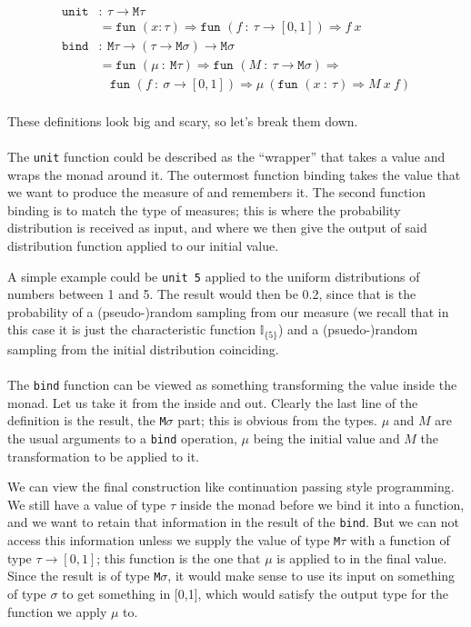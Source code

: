 \documentclass[11pt, leqno, titlepage]{article}
\theoremstyle{definition}
\begin{document}
\begin{align*}
  \texttt{unit} & :~ \tau\to\texttt{M}\tau\\
                & = \texttt{fun }(x:\tau)\Rightarrow
                  \texttt{fun }(f~:~\tau\to[0,1])\Rightarrow f~x\\
  \texttt{bind} & :~\texttt{M}\tau\to(\tau\to\texttt{M}\sigma)\to\texttt{M}\sigma\\
                & = \texttt{fun }(\mu~:~\texttt{M}\tau)\Rightarrow \texttt{fun }
                  (M~:~\tau\to\texttt{M}\sigma) \Rightarrow\\
                & ~~~~\texttt{fun }(f~:~\sigma\to[0,1])\Rightarrow \mu~ (\texttt{fun
                  }(x~:~\tau)\Rightarrow M~x~f)
\end{align*}
\\
These definitions look big and scary, so let's break them down.
\\ \\
The \texttt{unit} function could be described as the ``wrapper'' that takes a value
and wraps the monad around it. The outermost function binding
takes the value that we want to produce the measure of and remembers it. The second
function binding is to match the type of measures; this is where the probability
distribution is received as input, and where we then give the output of said
distribution function applied to our initial value.

A simple example could be \texttt{unit 5} applied to the uniform distributions of
numbers between 1 and 5. The result would then be 0.2, since that is the probability
of a (pseudo-)random sampling from our measure (we recall that in this case it is
just the characteristic function $\mathbb{I}_{\{5\}}$) and a (psuedo-)random sampling
from the initial distribution coinciding. 
\\ \\
The \texttt{bind} function can be viewed as something transforming the value inside
the monad. 
Let us take it from the inside and out. Clearly the last line of the definition is
the result, the \texttt{M}$\sigma$ part; this is obvious from the types. $\mu$ and
$M$ are the usual arguments to a \texttt{bind} operation, $\mu$ being the initial
value and $M$ the transformation to be applied to it.

We can view the final construction like continuation passing style programming. We
still have a value of type $\tau$ inside the monad before we bind it into a function,
and we want to retain that information in the result of the \texttt{bind}. But we can
not access this information unless we supply the value of type \texttt{M}$\tau$ with
a function of type $\tau \to [0,1]$; this function is the one that $\mu$ is applied
to in the final value. Since the result is of type \texttt{M}$\sigma$, it would make
sense to use its input on something of type $\sigma$ to get something in [0,1], which
would satisfy the output type for the function we apply $\mu$ to.
\end{document}
